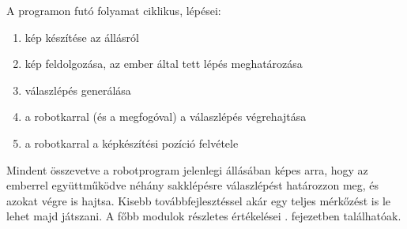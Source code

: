 \documentclass[../documentation.tex]{subfiles}
\begin{document}
A programon futó folyamat ciklikus, lépései:
\begin{enumerate}
	\item kép készítése az állásról
	\item kép feldolgozása, az ember által tett lépés meghatározása
	\item válaszlépés generálása
	\item a robotkarral (és a megfogóval) a válaszlépés végrehajtása
	\item a robotkarral a képkészítési pozíció felvétele
\end{enumerate}

Mindent összevetve a robotprogram jelenlegi állásában képes arra, hogy az emberrel együttműködve néhány sakklépésre válaszlépést határozzon meg, és azokat végre is hajtsa. Kisebb továbbfejlesztéssel akár egy teljes mérkőzést is le lehet majd játszani. A főbb modulok részletes értékelései . fejezetben találhatóak.
\end{document}
